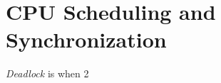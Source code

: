 \section{CPU Scheduling and Synchronization}\label{sec:CPU_Scheduling_Synchronization}
\begin{definition}[Deadlock]\label{def:Deadlock}
  \emph{Deadlock} is when 2
\end{definition}

